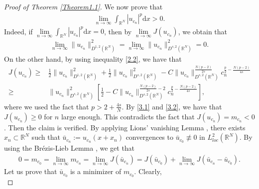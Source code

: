 \documentclass[12pt,a4paper,reqno]{amsart}
\numberwithin{equation}{section}
\begin{document}
\begin{proof}[Proof of Theorem \ref{Theorem1.1}]
We now prove that
\begin{equation*}
\begin{aligned}
\lim_{n\to\infty}
\int_{\mathbb{R}^{N}}
|u_{c_{n}}|^{p}
\mathrm{d}x
>0.
\end{aligned}
\end{equation*}
Indeed,
if $\lim\limits_{n\to\infty}
\int_{\mathbb{R}^{N}}
|u_{c_{n}}|^{p}
\mathrm{d}x=0$,
then by $\lim\limits_{n\to\infty}J(u_{c_{n}})$,
we obtain that
\begin{equation}\label{3.1}
\begin{aligned}
\lim_{n\to\infty}
\|u_{c_{n}}\|_{D^{1,2}(\mathbb{R}^{N})}^{2}
=
\lim_{n\to\infty}
\|u_{c_{n}}\|_{D^{s,2}(\mathbb{R}^{N})}^{2}
=0.
\end{aligned}
\end{equation}
On the other hand, by using inequality \eqref{2.2},
we have that
\begin{equation}\label{3.2}
\begin{aligned}
J(u_{c_{n}})
\geqslant&
\frac{1}{2}
\|u_{c_{n}}\|_{D^{1,2}(\mathbb{R}^{N})}^{2}
+
\frac{1}{2}
\|u_{c_{n}}\|_{D^{s,2}(\mathbb{R}^{N})}^{2}
-
C
\|u_{c_{n}}\|_{D^{s,2}(\mathbb{R}^{N})}^{\frac{N(p-2)}{2s}}
c_{n}^{\frac{p}{2}-\frac{N(p-2)}{4s}}\\
\geqslant&
\|u_{c_{n}}\|_{D^{s,2}(\mathbb{R}^{N})}^{2}
\left[
\frac{1}{2}
-
C
\|u_{c_{n}}\|_{D^{s,2}(\mathbb{R}^{N})}^{\frac{N(p-2)}{2s}-2}
c_{n}^{\frac{p}{2}-\frac{N(p-2)}{4s}}
\right],
\end{aligned}
\end{equation}
where we used the fact that $p>2+\frac{4s}{N}$.
By \eqref{3.1} and \eqref{3.2},
we have that $J(u_{c_{n}})\geqslant 0$ for $n$ large enough.
This contradicts the fact that $J(u_{c_{n}})=m_{c_{n}}<0$.
Then the claim is verified.
By applying Lions' vanishing Lemma \cite{Willem1996Book},
there exists $x_{n}\subset \mathbb{R}^{N}$ such that  $\bar{u}_{c_{n}}:=u_{c_{n}}(x+x_{n})$ convergences to $\bar{u}_{c_{0}}\not \equiv0$ in $L_{loc}^{2}(\mathbb{R}^{N})$.
By using the Br\'{e}zis-Lieb Lemma \cite{Brezis-Lieb1983PAMS},
we get that
\begin{equation}\label{3.3}
\begin{aligned}
0=
m_{c_{0}}
=
\lim_{n\to\infty}
m_{c_{n}}
=
\lim_{n\to\infty}
J(\bar{u}_{c_{n}})
=J(\bar{u}_{c_{0}})
+\lim_{n\to\infty}J(\bar{u}_{c_{n}}-\bar{u}_{c_{0}}).
\end{aligned}
\end{equation}
Let us prove that $\bar{u}_{c_{0}}$ is a minimizer of $m_{c_{0}}$.
Clearly,
\begin{equation*}

\end{equation*}
\end{proof}
\end{document}
